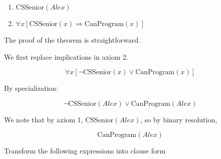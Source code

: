 \documentclass[11pt,largemargins, anonymous]{homework}
\begin{document}
\begin{enumerate}
    \item \( \mathrm{CSSenior}(Alex) \)
    \item \( \forall x [\mathrm{CSSenior}(x) \Rightarrow \mathrm{CanProgram}(x)] \)
\end{enumerate}

The proof of the theorem is straightforward.

We first replace implications in axiom 2.

\[ \forall x [\neg \mathrm{CSSenior}(x) \lor \mathrm{CanProgram}(x)] \]

By specialization:

\[ \neg \mathrm{CSSenior}(Alex) \lor \mathrm{CanProgram}(Alex) \]

We note that by axiom 1, \( \mathrm{CSSenior}(Alex) \), so by binary resolution,

\[ \mathrm{CanProgram}(Alex) \]

\question

Transform the following expressions into clause form
\end{document}
